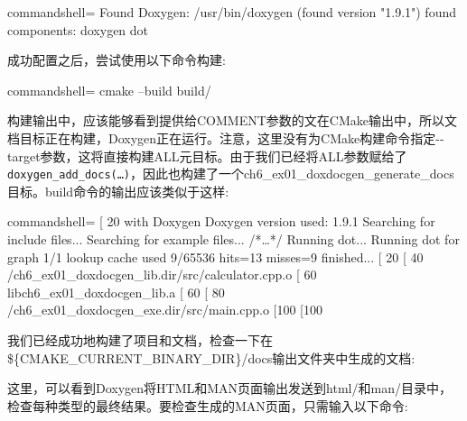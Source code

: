 \begin{tcblisting}{commandshell={}}
Found Doxygen: /usr/bin/doxygen (found version "1.9.1")
    found components: doxygen dot
\end{tcblisting}

成功配置之后，尝试使用以下命令构建:

\begin{tcblisting}{commandshell={}}
cmake --build build/
\end{tcblisting}

构建输出中，应该能够看到提供给COMMENT参数的文在CMake输出中，所以文档目标正在构建，Doxygen正在运行。注意，这里没有为CMake构建命令指定-{}-target参数，这将直接构建ALL元目标。由于我们已经将ALL参数赋给了\texttt{doxygen\_add\_docs(…)}，因此也构建了一个ch6\_ex01\_doxdocgen\_generate\_docs目标。build命令的输出应该类似于这样:

\begin{tcblisting}{commandshell={}}
[ 20%
with Doxygen
Doxygen version used: 1.9.1
Searching for include files...
Searching for example files...
/*…*/
Running dot...
Running dot for graph 1/1
lookup cache used 9/65536 hits=13 misses=9
finished...
[ 20%
[ 40%
  /ch6_ex01_doxdocgen_lib.dir/src/calculator.cpp.o
[ 60%
libch6_ex01_doxdocgen_lib.a
[ 60%
[ 80%
  /ch6_ex01_doxdocgen_exe.dir/src/main.cpp.o
[100%
[100%
\end{tcblisting}

我们已经成功地构建了项目和文档，检查一下在\$\{CMAKE\_CURRENT\_BINARY\_DIR\}/docs输出文件夹中生成的文档:


这里，可以看到Doxygen将HTML和MAN页面输出发送到html/和man/目录中，检查每种类型的最终结果。要检查生成的MAN页面，只需输入以下命令:

